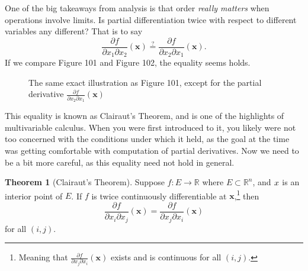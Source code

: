 \documentclass{article}
\newcommand{\R}{\mathbb{R}}
\newcommand{\x}{\mathbf{x}}
\theoremstyle{definition}
\newtheorem{theorem}{Theorem}[section]
\begin{document}
	One of the big takeaways from analysis is that order \textit{really matters} when operations involve limits. Is partial differentiation twice with respect to different variables any different? That is to say  $$\frac{\partial f}{\partial x_1\partial x_2}(\x)  \stackrel{?}{=}\frac{\partial f}{\partial x_2\partial x_1}(\x) .$$ If we compare Figure 101 and Figure 102, the equality seems holds. 
	\begin{figure}
		\centering
		\caption{The same exact illustration as Figure 101, except for the partial derivative $ \frac{\partial f}{\partial x_2\partial x_1}(\x)$ }
	\end{figure}	
	This equality is known as Clairaut's Theorem, and is one of the highlights of multivariable calculus. When you were first introduced to it, you likely were not too concerned with the conditions under which it held, as the goal at the time was getting comfortable with computation of partial derivatives. Now we need to be a bit more careful, as this equality need not hold in general.
	\begin{theorem}[Clairaut's Theorem]
		Suppose $ f:E\to\R $ where $ E\subset \R^n $, and $ \mathbf \x$ is an interior point of $ E $. If $ f $ is twice continuously differentiable at $ \x $,\footnote{Meaning that $ \frac{\partial f}{\partial x_j\partial x_i}(\x) $ exists and is continuous for all $ (i,j) $. } then $$\frac{\partial f}{\partial x_i\partial x_j}(\x) = \frac{\partial f}{\partial x_j\partial x_i}(\x)$$ for all $ (i,j) $.  
	\end{theorem}
\end{document}
